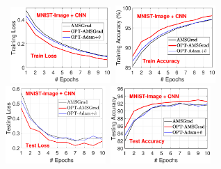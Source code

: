 \documentclass[wcp]{jmlr}
\begin{document}
\begin{figure}[t]
\centering
\mbox{\hspace{-0.2in}
\includegraphics[width=1.5in]{new_figure/new_mnist_img_figure/mnist_img_train_loss_disz_2.eps}\hspace{-0.12in}
\includegraphics[width=1.5in]{new_figure/new_mnist_img_figure/mnist_img_train_acc_disz_2.eps}\hspace{-0.12in}
\includegraphics[width=1.5in]{new_figure/mnist_img_test_loss_disz.eps}\hspace{-0.12in}
\includegraphics[width=1.5in]{new_figure/mnist_img_test_acc_disz.eps}
}


\end{figure}
\end{document}
